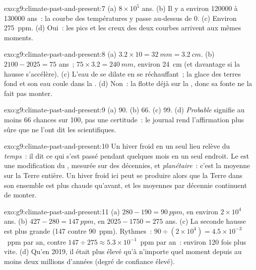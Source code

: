 \begin{solution}{exo:g9:climate-past-and-present:7}
(a) $8 \times 10^5$ ans. (b) Il y a environ \num{120000} à \num{130000}
ans~: la courbe des températures y passe au-dessus de 0. (c) Environ
\qty{275}{ppm}. (d) Oui~: les pics et les creux des deux courbes arrivent
aux mêmes moments.
\end{solution}

\begin{solution}{exo:g9:climate-past-and-present:8}
(a) $3.2 \times 10 = \qty{32}{mm} = \qty{3.2}{cm}$. (b) $2100 - 2025 =
75$ ans~; $75 \times 3.2 = \qty{240}{mm}$, environ \qty{24}{cm} (et
davantage si la hausse s'accélère). (c) L'eau de  se dilate en se
réchauffant~; la glace des terres fond et son eau coule dans la .
(d) Non~: la  flotte déjà sur la , donc sa fonte ne la fait pas
monter.
\end{solution}

\begin{solution}{exo:g9:climate-past-and-present:9}
(a) 90. (b) 66. (c) 99. (d) \emph{Probable} signifie au moins 66 chances
sur 100, pas une certitude~: le journal rend l'affirmation plus sûre que
ne l'ont dit les scientifiques.
\end{solution}

\begin{solution}{exo:g9:climate-past-and-present:10}
Un hiver froid en un seul lieu relève du \emph{temps}~: il dit ce qui
s'est passé pendant quelques mois en un seul endroit. Le  est une modification du \emph{}, mesurée sur des
décennies, et \emph{planétaire}~: c'est la moyenne sur la Terre entière.
Un hiver froid ici peut se produire alors que la Terre dans son ensemble
est plus chaude qu'avant, et les moyennes par décennie continuent de
monter.
\end{solution}

\begin{solution}{exo:g9:climate-past-and-present:11}
(a) $280 - 190 = \qty{90}{ppm}$, en environ $2 \times 10^4$ ans. (b) $427
- 280 = \qty{147}{ppm}$, en $2025 - 1750 = 275$ ans. (c) La seconde
hausse est plus grande (147 contre 90~ppm). Rythmes~: $90 \div (2 \times 10^4) =
4.5 \times 10^{-3}$~ppm par an, contre $147 \div 275 \approx 5.3 \times
10^{-1}$~ppm par an~: environ 120 fois plus vite. (d) Qu'en 2019, il
était plus élevé qu'à n'importe quel moment depuis au moins deux millions
d'années (degré de confiance élevé).
\end{solution}

